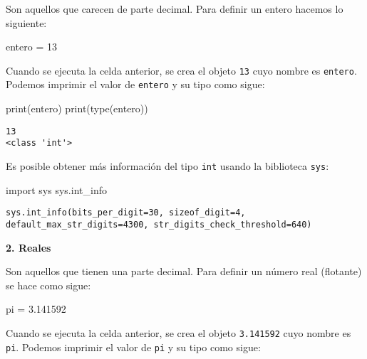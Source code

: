 \documentclass[
  letterpaper,
  DIV=11,
  numbers=noendperiod]{scrreprt}
\newenvironment{Shaded}{\begin{snugshade}}{\end{snugshade}}
\newcommand{\BuiltInTok}[1]{\textcolor[rgb]{0.00,0.23,0.31}{#1}}
\newcommand{\DecValTok}[1]{\textcolor[rgb]{0.68,0.00,0.00}{#1}}
\newcommand{\FloatTok}[1]{\textcolor[rgb]{0.68,0.00,0.00}{#1}}
\newcommand{\ImportTok}[1]{\textcolor[rgb]{0.00,0.46,0.62}{#1}}
\newcommand{\NormalTok}[1]{\textcolor[rgb]{0.00,0.23,0.31}{#1}}
\newcommand{\OperatorTok}[1]{\textcolor[rgb]{0.37,0.37,0.37}{#1}}
\begin{document}
Son aquellos que carecen de parte decimal. Para definir un entero
hacemos lo siguiente:

\begin{Shaded}
\begin{Highlighting}[]
\NormalTok{entero }\OperatorTok{=} \DecValTok{13}
\end{Highlighting}
\end{Shaded}

Cuando se ejecuta la celda anterior, se crea el objeto \texttt{13} cuyo
nombre es \texttt{entero}. Podemos imprimir el valor de \texttt{entero}
y su tipo como sigue:

\begin{Shaded}
\begin{Highlighting}[]
\BuiltInTok{print}\NormalTok{(entero)}
\BuiltInTok{print}\NormalTok{(}\BuiltInTok{type}\NormalTok{(entero))}
\end{Highlighting}
\end{Shaded}

\begin{verbatim}
13
<class 'int'>
\end{verbatim}

Es posible obtener más información del tipo \texttt{int} usando la
biblioteca \texttt{sys}:

\begin{Shaded}
\begin{Highlighting}[]
\ImportTok{import}\NormalTok{ sys}
\NormalTok{sys.int\_info}
\end{Highlighting}
\end{Shaded}

\begin{verbatim}
sys.int_info(bits_per_digit=30, sizeof_digit=4, default_max_str_digits=4300, str_digits_check_threshold=640)
\end{verbatim}

\textbf{2. Reales}

Son aquellos que tienen una parte decimal. Para definir un número real
(flotante) se hace como sigue:

\begin{Shaded}
\begin{Highlighting}[]
\NormalTok{pi }\OperatorTok{=} \FloatTok{3.141592}
\end{Highlighting}
\end{Shaded}

Cuando se ejecuta la celda anterior, se crea el objeto \texttt{3.141592}
cuyo nombre es \texttt{pi}. Podemos imprimir el valor de \texttt{pi} y
su tipo como sigue:
\end{document}
